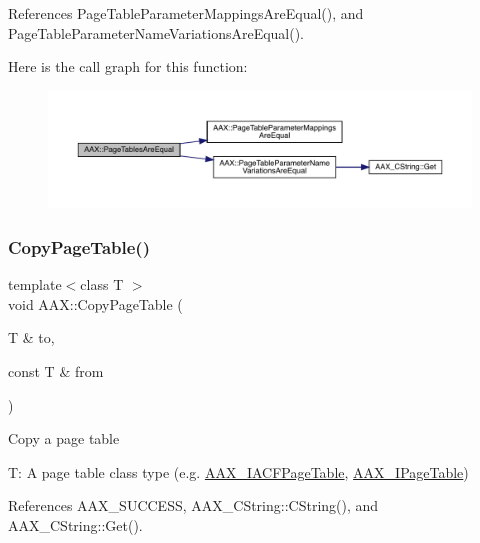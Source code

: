 References Page\+Table\+Parameter\+Mappings\+Are\+Equal(), and Page\+Table\+Parameter\+Name\+Variations\+Are\+Equal().

Here is the call graph for this function\+:
\nopagebreak
\begin{figure}[H]
\begin{center}
\leavevmode
\includegraphics[width=350pt]{a00852_a315085bafc0ddf4e7043a69d070da2fb_cgraph}
\end{center}
\end{figure}
\mbox{\label{a00852_a99fe28eb20cfcef49e99710060c5ebe0}} 
\subsubsection{\texorpdfstring{CopyPageTable()}{CopyPageTable()}}
{\footnotesize\ttfamily template$<$class T $>$ \\
void A\+A\+X\+::\+Copy\+Page\+Table (\begin{DoxyParamCaption}\item[{T \&}]{to,  }\item[{const T \&}]{from }\end{DoxyParamCaption})\hspace{0.3cm}{\ttfamily [inline]}}

Copy a page table

{\ttfamily T\+:} A page table class type (e.\+g. \mbox{\hyperlink{a01725}{A\+A\+X\+\_\+\+I\+A\+C\+F\+Page\+Table}}, \mbox{\hyperlink{a01849}{A\+A\+X\+\_\+\+I\+Page\+Table}}) 

References A\+A\+X\+\_\+\+S\+U\+C\+C\+E\+SS, A\+A\+X\+\_\+\+C\+String\+::\+C\+String(), and A\+A\+X\+\_\+\+C\+String\+::\+Get().

